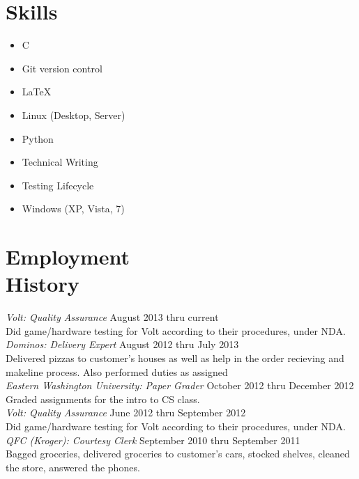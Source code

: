 \documentclass[line, margin]{res}
\begin{document}
\begin{resume}
\section{Skills}
\begin{multicols}{2}
  \begin{itemize}
    \item C
    \item Git version control
    \item \LaTeX
    \item Linux (Desktop, Server)
    \item Python
    \item Technical Writing
    \item Testing Lifecycle
    \item Windows (XP, Vista, 7)
  \end{itemize}
\end{multicols}

\section{Employment\\History}
 \textit{Volt: Quality Assurance} \hfill August 2013 thru current \\
 Did game/hardware testing for Volt according to their procedures, under NDA. \\ [6pt]
 \textit{Dominos: Delivery Expert} \hfill August 2012 thru July 2013 \\
 Delivered pizzas to customer's houses as well as help in the order
 recieving and makeline process. Also performed duties as assigned \\ [6pt]
 \textit{Eastern Washington University: Paper Grader} \hfill October 2012 thru December 2012 \\
 Graded assignments for the intro to CS class. \\ [6pt]
 \textit{Volt: Quality Assurance} \hfill June 2012 thru September 2012 \\
 Did game/hardware testing for Volt according to their procedures, under NDA. \\ [6pt]
 \textit{QFC (Kroger): Courtesy Clerk} \hfill September 2010 thru September 2011 \\
 Bagged groceries, delivered groceries to customer's cars, stocked
 shelves, cleaned the store, answered the phones. \\ 

\end{resume}
\end{document}
